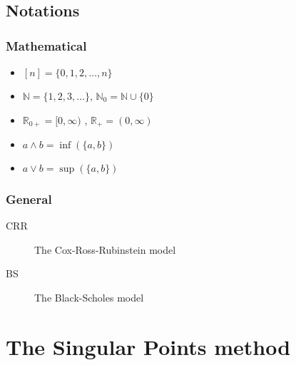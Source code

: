 \documentclass[12pt,a4paper]{amsbook}
\begin{document}
\frontmatter









\tableofcontents
\clearpage


\section*{Notations}

\subsection*{Mathematical}
\begin{itemize}
\item $ [n] = \{0, 1, 2, \dots, n\} $
\item $ \mathbb{N} = \{ 1, 2, 3, \dots \} $, $\mathbb{N}_0 = \mathbb{N} \cup \{ 0 \} $ 
\item $ \mathbb{R}_{0+} = [0, \infty) $ , $ \mathbb{R}_{+} = (0, \infty) $
\item $ a \wedge b = \inf(\{ a, b \}) $
\item $ a \vee b = \sup(\{ a, b \}) $
\end{itemize}

\subsection*{General}
\begin{description}
	\item[CRR] The Cox-Ross-Rubinstein model
	\item[BS] The Black-Scholes model
\end{description}



\mainmatter

%


%


\chapter{The Singular Points method}
\label{cha:sp}



\appendix


\backmatter

% 
\printbibliography
\end{document}
